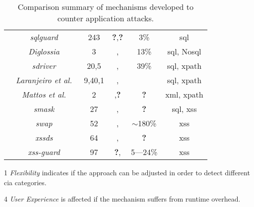 \documentclass[conference]{IEEEtran}
\newcommand{\tick}{\ding{52}}
\newcommand{\xmark}{\ding{56}}
\begin{document}
\begin{table*}
\begin{threeparttable}
\begin{small}
{\begin{tabular}{l|c|c|cc|c}
	& 	{\it {\sc sqlg}uard}~\cite{BWS05} & 243 & {\bf ?},{\bf ?} & 3\% & {\sc sql} \\
	& 	{\it Diglossia}~\cite{SMS13} & 3 & \xmark,\xmark  & 13\% & {\sc sql}, No{\sc sql} \\
	& 	{\it {\sc sd}river}~\cite{MS09,MKS09} & 20,5 & \tick,\tick & 39\% & {\sc sql}, {\sc xp}ath \\
	& 	{\it Laranjeiro et al.}~\cite{LVM09,ALVM09,LVM10} & 9,40,1 & \xmark,\xmark  & \xmark & {\sc sql}, {\sc xp}ath \\
	& 	{\it Mattos et al.}~\cite{MSM13} & 2 & \tick,{\bf ?} &  {\bf ?} & {\sc xml}, {\sc xp}ath \\
	& 	{\it {\sc sm}ask}~\cite{JB07} & 27 & \xmark,\xmark & {\bf ?} & {\sc sql}, {\sc xss} \\
	& 	{\it {\sc swap}}~\cite{WPLKK09} & 52 & \tick,\tick & $\sim$180\% & {\sc xss} \\ 
    & 	{\it {\sc xssds}}~\cite{JEP08} & 64 & \xmark,\xmark & {\bf ?} &  {\sc xss} \\
    & 	{\it {\sc xss-guard}}~\cite{BV08} & 97 & {\bf ?},\xmark & 5---24\% & {\sc xss} \\
	\hline
    \end{tabular}}
    \begin{tablenotes}
	\begin{footnotesize}
       \item[1] {\it Flexibility} indicates if the approach can be adjusted
	in order to detect different {\sc cia} categories.
       \item[4] {\it User Experience} is affected if the mechanism suffers
	from runtime overhead.
	\end{footnotesize}
    \end{tablenotes}
    \caption{Comparison summary of mechanisms developed to counter application attacks.}
    \label{tab:comp2}
    \end{small}
    \end{threeparttable}
\end{table*}



\end{document}
